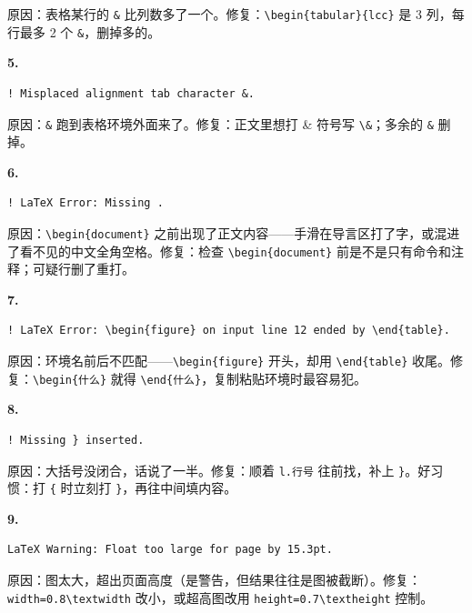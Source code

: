原因：表格某行的 \texttt{\&} 比列数多了一个。修复：\texttt{\textbackslash{}begin\{tabular\}\{lcc\}} 是 3 列，每行最多 2 个 \texttt{\&}，删掉多的。

\textbf{5.}

\begin{lstlisting}
! Misplaced alignment tab character &.
\end{lstlisting}

原因：\texttt{\&} 跑到表格环境外面来了。修复：正文里想打 \& 符号写 \texttt{\textbackslash{}\&}；多余的 \texttt{\&} 删掉。

\textbf{6.}

\begin{lstlisting}
! LaTeX Error: Missing .
\end{lstlisting}

原因：\texttt{\textbackslash{}begin\{document\}} 之前出现了正文内容——手滑在导言区打了字，或混进了看不见的中文全角空格。修复：检查 \texttt{\textbackslash{}begin\{document\}} 前是不是只有命令和注释；可疑行删了重打。

\textbf{7.}

\begin{lstlisting}
! LaTeX Error: \begin{figure} on input line 12 ended by \end{table}.
\end{lstlisting}

原因：环境名前后不匹配——\texttt{\textbackslash{}begin\{figure\}} 开头，却用 \texttt{\textbackslash{}end\{table\}} 收尾。修复：\texttt{\textbackslash{}begin\{什么\}} 就得 \texttt{\textbackslash{}end\{什么\}}，复制粘贴环境时最容易犯。

\textbf{8.}

\begin{lstlisting}
! Missing } inserted.
\end{lstlisting}

原因：大括号没闭合，话说了一半。修复：顺着 \texttt{l.行号} 往前找，补上 \texttt{\}}。好习惯：打 \texttt{\{} 时立刻打 \texttt{\}}，再往中间填内容。

\textbf{9.}

\begin{lstlisting}
LaTeX Warning: Float too large for page by 15.3pt.
\end{lstlisting}

原因：图太大，超出页面高度（是警告，但结果往往是图被截断）。修复：\texttt{width=0.8\textbackslash{}textwidth} 改小，或超高图改用 \texttt{height=0.7\textbackslash{}textheight} 控制。

